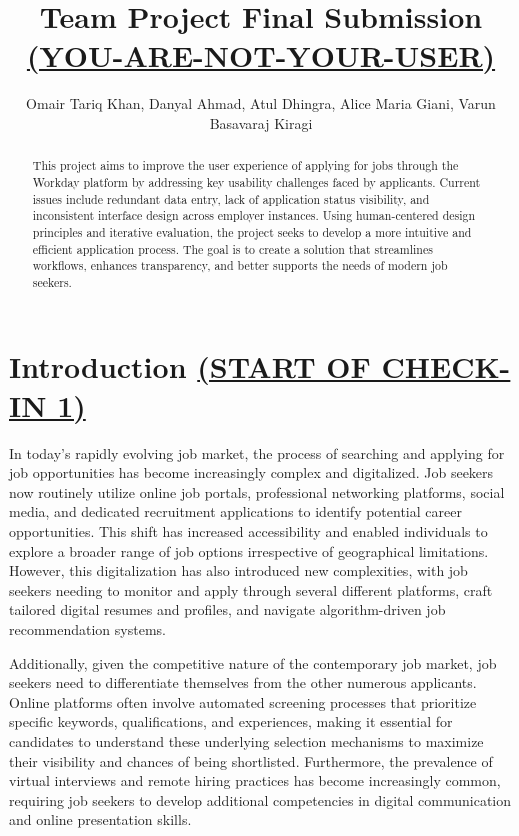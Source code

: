 \documentclass[
	letterpaper, %
]{jdf}
\author{Omair Tariq Khan, Danyal Ahmad, Atul Dhingra, Alice Maria Giani, Varun Basavaraj Kiragi}
\title{Team Project Final Submission \underline{\textbf{(YOU-ARE-NOT-YOUR-USER)}}}
\begin{document}

\maketitle
\begin{sloppypar}


\begin{abstract}
	This project aims to improve the user experience of applying for jobs through the Workday platform by addressing key usability challenges faced by applicants. Current issues include redundant data entry, lack of application status visibility, and inconsistent interface design across employer instances. Using human-centered design principles and iterative evaluation, the project seeks to develop a more intuitive and efficient application process. The goal is to create a solution that streamlines workflows, enhances transparency, and better supports the needs of modern job seekers.
\end{abstract}

\hfill \break

\section{Introduction \underline{(START OF CHECK-IN 1)}}
In today's rapidly evolving job market, the process of searching and applying for job opportunities has become increasingly complex and digitalized. Job seekers now routinely utilize online job portals, professional networking platforms, social media, and dedicated recruitment applications to identify potential career opportunities. This shift has increased accessibility and enabled individuals to explore a broader range of job options irrespective of geographical limitations. However, this digitalization has also introduced new complexities, with job seekers needing to monitor and apply through several different platforms, craft tailored digital resumes and profiles, and navigate algorithm-driven job recommendation systems.

Additionally, given the competitive nature of the contemporary job market, job seekers need to differentiate themselves from the other numerous applicants. Online platforms often involve automated screening processes that prioritize specific keywords, qualifications, and experiences, making it essential for candidates to understand these underlying selection mechanisms to maximize their visibility and chances of being shortlisted. Furthermore, the prevalence of virtual interviews and remote hiring practices has become increasingly common, requiring job seekers to develop additional competencies in digital communication and online presentation skills.


\end{sloppypar}
\end{document}
